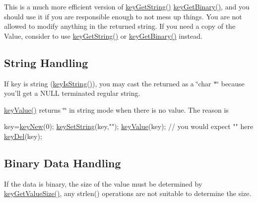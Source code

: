 This is a much more efficient version of \hyperlink{group__keyvalue_ga41b9fac5ccddafe407fc0ae1e2eb8778}{key\+Get\+String()} \hyperlink{group__keyvalue_ga4c0d8a4a11174197699c231e0b5c3c84}{key\+Get\+Binary()}, and you should use it if you are responsible enough to not mess up things. You are not allowed to modify anything in the returned string. If you need a copy of the Value, consider to use \hyperlink{group__keyvalue_ga41b9fac5ccddafe407fc0ae1e2eb8778}{key\+Get\+String()} or \hyperlink{group__keyvalue_ga4c0d8a4a11174197699c231e0b5c3c84}{key\+Get\+Binary()} instead.\hypertarget{group__keyvalue_string}{}\subsection{String Handling}\label{group__keyvalue_string}
If {\ttfamily key} is string (\hyperlink{group__keytest_gaea7670778abd07fee0fe8ac12a149190}{key\+Is\+String()}), you may cast the returned as a {\ttfamily \char`\"{}char $\ast$\char`\"{}} because you'll get a N\+U\+L\+L terminated regular string.

\hyperlink{group__keyvalue_ga6f29609c5da53c6dc26a98678d5752af}{key\+Value()} returns \char`\"{}\char`\"{} in string mode when there is no value. The reason is 
\begin{DoxyCode}
key=\hyperlink{group__key_gad23c65b44bf48d773759e1f9a4d43b89}{keyNew}(0);
\hyperlink{group__keyvalue_ga622bde1eb0e0c4994728331326340ef2}{keySetString}(key,\textcolor{stringliteral}{""});
\hyperlink{group__keyvalue_ga6f29609c5da53c6dc26a98678d5752af}{keyValue}(key); \textcolor{comment}{// you would expect "" here}
\hyperlink{group__key_ga3df95bbc2494e3e6703ece5639be5bb1}{keyDel}(key);
\end{DoxyCode}
\hypertarget{group__keyvalue_binary}{}\subsection{Binary Data Handling}\label{group__keyvalue_binary}
If the data is binary, the size of the value must be determined by \hyperlink{group__keyvalue_gae326672fffb7474abfe9baf53b73217e}{key\+Get\+Value\+Size()}, any strlen() operations are not suitable to determine the size.

